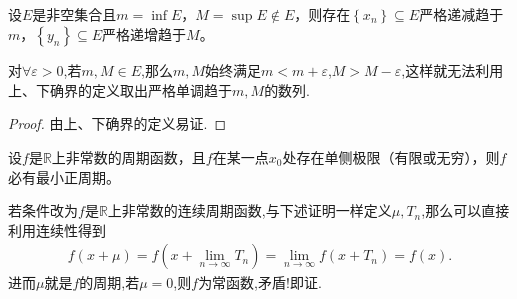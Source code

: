 \documentclass[../../main.tex]{subfiles}%
\begin{document}
\begin{proposition}\label{proposition:确界不在集合中必存在严格单调数列}
设$E$是非空集合且$m=\inf\limits_{}E$，$M=\sup\limits_{}E\notin E$，则存在$\left\{ x_n \right\} \subseteq E$严格递减趋于$m$，$\left\{ y_n \right\} \subseteq E$严格递增趋于$M$。
\end{proposition}
\begin{note}
对$\forall \varepsilon>0$,若$m,M\in E$,那么$m,M$始终满足$m<m+\varepsilon$,$M>M-\varepsilon$,这样就无法利用上、下确界的定义取出严格单调趋于$m,M$的数列.
\end{note}
\begin{proof}

由上、下确界的定义易证.

\end{proof}

\begin{proposition}
设$f$是$\mathbb{R}$上非常数的周期函数，且$f$在某一点$x_0$处存在单侧极限（有限或无穷），则$f$必有最小正周期。
\end{proposition}
\begin{note}
若条件改为$f$是$\mathbb{R}$上非常数的连续周期函数,与下述证明一样定义$\mu,T_n$,那么可以直接利用连续性得到
\begin{align*}
f\left( x+\mu \right) =f\left( x+\underset{n\rightarrow \infty}{\lim}T_n \right) =\underset{n\rightarrow \infty}{\lim}f\left( x+T_n \right) =f\left( x \right) .
\end{align*}
进而$\mu$就是$f$的周期,若$\mu =0$,则$f$为常函数,矛盾!即证.
\end{note}
\end{document}
